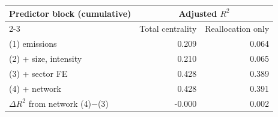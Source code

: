 \begin{tabular}{lrr}
\toprule
Predictor block (cumulative) & \multicolumn{2}{c}{Adjusted $R^2$} \\
\cmidrule(lr){2-3}
 & Total centrality & Reallocation only \\
\midrule
(1) emissions & 0.209 & 0.064 \\
(2) + size, intensity & 0.210 & 0.065 \\
(3) + sector FE & 0.428 & 0.389 \\
(4) + network & 0.428 & 0.391 \\
\midrule
$\Delta R^2$ from network (4)$-$(3) & -0.000 & 0.002 \\
\bottomrule
\end{tabular}
